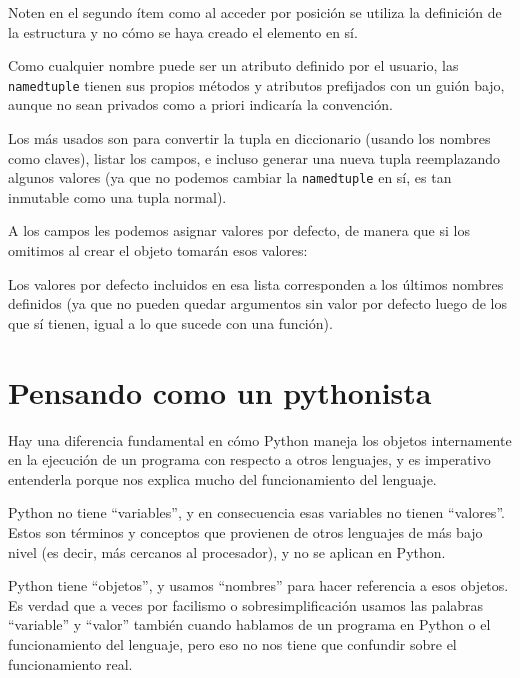 
Noten en el segundo ítem como al acceder por posición se utiliza la definición de la estructura y no cómo se haya creado el elemento en sí.

Como cualquier nombre puede ser un atributo definido por el usuario, las \texttt{namedtuple} tienen sus propios métodos y atributos prefijados con un guión bajo, aunque no sean privados como a priori indicaría la convención. 

Los más usados son para convertir la tupla en diccionario (usando los nombres como claves), listar los campos, e incluso generar una nueva tupla reemplazando algunos valores (ya que no podemos cambiar la \texttt{namedtuple} en sí, es tan inmutable como una tupla normal).


A los campos les podemos asignar valores por defecto, de manera que si los omitimos al crear el objeto tomarán esos valores: 


Los valores por defecto incluidos en esa lista corresponden a los últimos nombres definidos (ya que no pueden quedar argumentos sin valor por defecto luego de los que sí tienen, igual a lo que sucede con una función).


\section{Pensando como un pythonista}\label{sec:pensando-pythonista}

Hay una diferencia fundamental en cómo Python maneja los objetos internamente en la ejecución de un programa con respecto a otros lenguajes, y es imperativo entenderla porque nos explica mucho del funcionamiento del lenguaje.

Python no tiene ``variables'', y en consecuencia esas variables no tienen ``valores''. Estos son términos y conceptos que provienen de otros lenguajes de más bajo nivel (es decir, más cercanos al procesador), y no se aplican en Python. 

Python tiene ``objetos'', y usamos ``nombres'' para hacer referencia a esos objetos. Es verdad que a veces por facilismo o sobresimplificación usamos las palabras ``variable'' y ``valor'' también cuando hablamos de un programa en Python o el funcionamiento del lenguaje, pero eso no nos tiene que confundir sobre el funcionamiento real.

